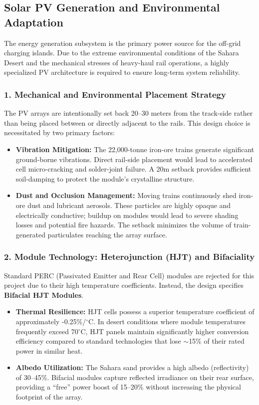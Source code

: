 \subsection{Solar PV Generation and Environmental Adaptation \label{Solar}}

The energy generation subsystem is the primary power source for the off-grid charging islands. Due to the extreme environmental conditions of the Sahara Desert and the mechanical stresses of heavy-haul rail operations, a highly specialized PV architecture is required to ensure long-term system reliability.

\subsubsection*{1. Mechanical and Environmental Placement Strategy}
The PV arrays are intentionally set back 20--30 meters from the track-side rather than being placed between or directly adjacent to the rails. This design choice is necessitated by two primary factors:
\begin{itemize}
    \item \textbf{Vibration Mitigation:} The 22,000-tonne iron-ore trains generate significant ground-borne vibrations. Direct rail-side placement would lead to accelerated cell micro-cracking and solder-joint failure. A 20m setback provides sufficient soil-damping to protect the module's crystalline structure.
    \item \textbf{Dust and Occlusion Management:} Moving trains continuously shed iron-ore dust and lubricant aerosols. These particles are highly opaque and electrically conductive; buildup on modules would lead to severe shading losses and potential fire hazards. The setback minimizes the volume of train-generated particulates reaching the array surface.
\end{itemize}

\subsubsection*{2. Module Technology: Heterojunction (HJT) and Bifaciality}
Standard PERC (Passivated Emitter and Rear Cell) modules are rejected for this project due to their high temperature coefficients. Instead, the design specifies \textbf{Bifacial HJT Modules}.
\begin{itemize}
    \item \textbf{Thermal Resilience:} HJT cells possess a superior temperature coefficient of approximately -0.25\%/$^\circ$C. In desert conditions where module temperatures frequently exceed 70$^\circ$C, HJT panels maintain significantly higher conversion efficiency compared to standard technologies that lose $\sim$15\% of their rated power in similar heat.
    \item \textbf{Albedo Utilization:} The Sahara sand provides a high albedo (reflectivity) of 30--45\%. Bifacial modules capture reflected irradiance on their rear surface, providing a ``free'' power boost of 15--20\% without increasing the physical footprint of the array.
\end{itemize}


